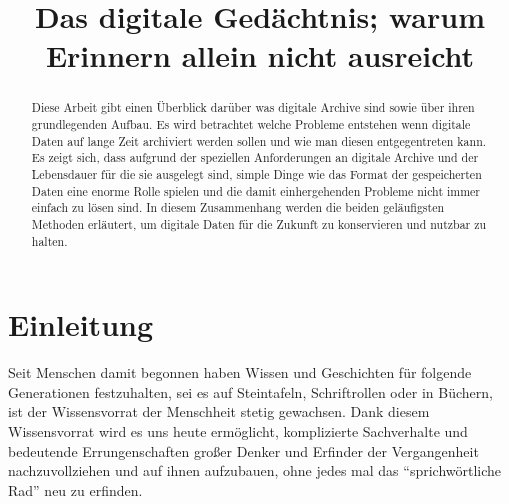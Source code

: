 \documentclass[conference,compsoc,final,a4paper]{IEEEtran}
\newcommand{\autoren}[0]{Nockel, Sascha}
\newcommand{\dokumententitel}[0]{Das digitale Gedächtnis; warum Erinnern allein nicht ausreicht}
\begin{document}
\title{\dokumententitel}

\author{
  \IEEEauthorblockN{\autoren}
}

\maketitle
\thispagestyle{plain}
\pagestyle{plain}


\begin{abstract}
Diese Arbeit gibt einen Überblick darüber was digitale Archive sind sowie über ihren grundlegenden Aufbau. Es wird betrachtet welche Probleme entstehen wenn digitale Daten auf lange Zeit archiviert werden sollen und wie man diesen entgegentreten kann. Es zeigt sich, dass aufgrund der speziellen Anforderungen an digitale Archive und der Lebensdauer für die sie ausgelegt sind, simple Dinge wie das Format der gespeicherten Daten eine enorme Rolle spielen und die damit einhergehenden Probleme nicht immer einfach zu lösen sind. In diesem Zusammenhang werden die beiden geläufigsten Methoden erläutert, um digitale Daten für die Zukunft zu konservieren und nutzbar zu halten.

\end{abstract}

{\small\tableofcontents}

\section{Einleitung}
Seit Menschen damit begonnen haben Wissen und Geschichten für folgende Generationen festzuhalten, sei es auf Steintafeln, Schriftrollen oder in Büchern, ist der Wissensvorrat der Menschheit stetig gewachsen. Dank diesem Wissensvorrat wird es uns heute ermöglicht, komplizierte Sachverhalte und bedeutende Errungenschaften großer Denker und Erfinder der Vergangenheit nachzuvollziehen und auf ihnen aufzubauen, ohne jedes mal das \enquote{sprichwörtliche Rad} neu zu erfinden.
\end{document}
